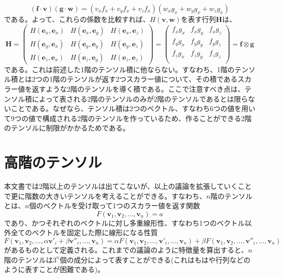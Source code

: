 \begin{equation}
	(\boldsymbol{f}\cdot\boldsymbol{v})(\boldsymbol{g}\cdot\boldsymbol{w})=(v_xf_x+v_yf_x+v_zf_x)(w_xg_x+w_yg_x+w_zg_x)
\end{equation}
である。よって、これらの係数を比較すれば、\(H(\boldsymbol{v},\boldsymbol{w})\)を表す行列\(\boldsymbol{H}\)は、
\begin{equation}
	\boldsymbol{H}=
	\begin{pmatrix}
		H(\boldsymbol{e}_x,\boldsymbol{e}_x) & H(\boldsymbol{e}_x,\boldsymbol{e}_y) & H(\boldsymbol{e}_x,\boldsymbol{e}_z) \\
		H(\boldsymbol{e}_y,\boldsymbol{e}_x) & H(\boldsymbol{e}_y,\boldsymbol{e}_y) & H(\boldsymbol{e}_y,\boldsymbol{e}_z) \\
		H(\boldsymbol{e}_z,\boldsymbol{e}_x) & H(\boldsymbol{e}_z,\boldsymbol{e}_y) & H(\boldsymbol{e}_z,\boldsymbol{e}_z)
	\end{pmatrix}
	=
	\begin{pmatrix}
		f_x g_x & f_x g_y & f_x g_z \\
		f_y g_x & f_y g_y & f_y g_z \\
		f_z g_x & f_z g_y & f_z g_z \\
	\end{pmatrix}
	= \boldsymbol{f}\otimes \boldsymbol{g}
\end{equation}
である。これは前述した1階のテンソル積に他ならない。すなわち、1階のテンソル積とは2つの1階のテンソルが返す2つスカラー値について、その積であるスカラー値を返すような2階のテンソルを導く積である。ここで注意すべき点は、テンソル積によって表される2階のテンソルのみが2階のテンソルであるとは限らないことである。なぜなら、テンソル積は2つのベクトル、すなわち6つの値を用いて9つの値で構成される2階のテンソルを作っているため、作ることができる2階のテンソルに制限がかかるためである。

\section{高階のテンソル}
本文書では2階以上のテンソルは出てこないが、以上の議論を拡張していくことで更に階数の大きいテンソルを考えることができる。すなわち、\(n\)階のテンソルとは、\(n\)個のベクトルを受け取って1つのスカラー値を返す関数
\begin{equation}
	F(\boldsymbol{v}_1,\boldsymbol{v}_2, \ldots ,\boldsymbol{v}_n)=a
\end{equation}
であり、かつそれぞれのベクトルに対し多重線形性、すなわち1つのベクトル以外全てのベクトルを固定した際に線形になる性質
\begin{equation}
	F(\boldsymbol{v}_1,\boldsymbol{v}_2, \ldots ,\alpha\boldsymbol{v'}_i+\beta\boldsymbol{v''}_i, \ldots ,\boldsymbol{v}_n)=
	\alpha F(\boldsymbol{v}_1,\boldsymbol{v}_2, \ldots ,\boldsymbol{v'}_i, \ldots ,\boldsymbol{v}_n)+
	\beta F(\boldsymbol{v}_1,\boldsymbol{v}_2, \ldots ,\boldsymbol{v''}_i, \ldots ,\boldsymbol{v}_n)
\end{equation}
があるものとして定義される。これまでの議論のように特徴量を算出すると、\(n\)階のテンソルは\(3^n\)個の成分によって表すことができる(これはもはや行列などのように表すことが困難である)。

